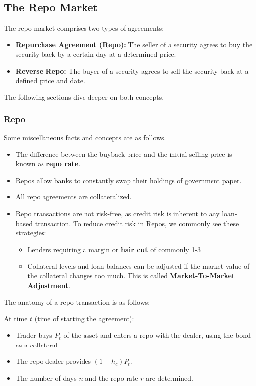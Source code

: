 \documentclass[10pt,letterpaper]{article}
\begin{document}
\subsection{The Repo Market}
The repo market comprises two types of agreements:
\begin{itemize}
\item \textbf{Repurchase Agreement (Repo):} The seller of a security agrees to buy the security back by a certain day at a determined price.
\item \textbf{Reverse Repo:} The buyer of a security agrees to sell the security back at a defined price and date.
\end{itemize}
The following sections dive deeper on both concepts.

\subsubsection{Repo}
Some miscellaneous facts and concepts are as follows.
\begin{itemize}
\item The difference between the buyback price and the initial selling price is known as \textbf{repo rate}.
\item Repos allow banks to constantly swap their holdings of government paper.
\item All repo agreements are collateralized.
\item Repo transactions are not risk-free, as credit risk is inherent to any loan-based transaction. To reduce credit risk in Repos, we commonly see these strategies:
\begin{itemize}
\item Lenders requiring a margin or \textbf{hair cut} of commonly 1-3%
\item Collateral levels and loan balances can be adjusted if the market value of the collateral changes too much. This is called \textbf{Market-To-Market Adjustment}.
\end{itemize}
\end{itemize}

The anatomy of a repo transaction is as follows:

At time $t$ (time of starting the agreement):
\begin{itemize}
\item Trader buys $P_t$ of the asset and enters a repo with the dealer, using the bond as a collateral.
\item The repo dealer provides $(1 - h_c) P_t$.
\item The number of days $n$ and the repo rate $r$ are determined.
\end{itemize}
\end{document}
